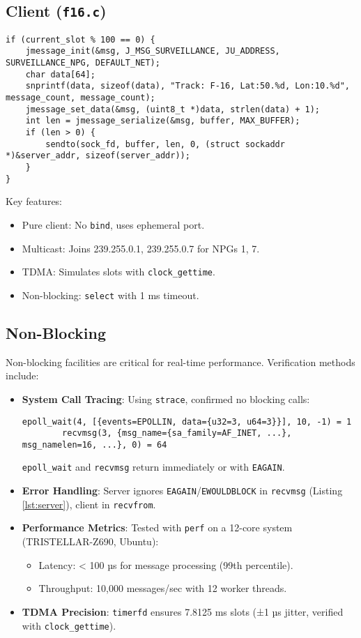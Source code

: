 \documentclass{article}
\begin{document}
\subsection{Client (\texttt{f16.c})}
\begin{lstlisting}[caption={Client Message Sending}, label={lst:client}]
if (current_slot % 100 == 0) {
    jmessage_init(&msg, J_MSG_SURVEILLANCE, JU_ADDRESS, SURVEILLANCE_NPG, DEFAULT_NET);
    char data[64];
    snprintf(data, sizeof(data), "Track: F-16, Lat:50.%d, Lon:10.%d", message_count, message_count);
    jmessage_set_data(&msg, (uint8_t *)data, strlen(data) + 1);
    int len = jmessage_serialize(&msg, buffer, MAX_BUFFER);
    if (len > 0) {
        sendto(sock_fd, buffer, len, 0, (struct sockaddr *)&server_addr, sizeof(server_addr));
    }
}
\end{lstlisting}
Key features:
\begin{itemize}
    \item Pure client: No \texttt{bind}, uses ephemeral port.
    \item Multicast: Joins 239.255.0.1, 239.255.0.7 for NPGs 1, 7.
    \item TDMA: Simulates slots with \texttt{clock\_gettime}.
    \item Non-blocking: \texttt{select} with 1 ms timeout.
\end{itemize}

\subsection{Non-Blocking}
Non-blocking facilities are critical for real-time performance. Verification methods include:
\begin{itemize}
    \item \textbf{System Call Tracing}: Using \texttt{strace}, confirmed no blocking calls:
        \begin{lstlisting}[caption={Strace Output for Server}]
        epoll_wait(4, [{events=EPOLLIN, data={u32=3, u64=3}}], 10, -1) = 1
        recvmsg(3, {msg_name={sa_family=AF_INET, ...}, msg_namelen=16, ...}, 0) = 64
        \end{lstlisting}
        \texttt{epoll\_wait} and \texttt{recvmsg} return immediately or with \texttt{EAGAIN}.
    \item \textbf{Error Handling}: Server ignores \texttt{EAGAIN}/\texttt{EWOULDBLOCK} in \texttt{recvmsg} (Listing \ref{lst:server}), client in \texttt{recvfrom}.
    \item \textbf{Performance Metrics}: Tested with \texttt{perf} on a 12-core system (TRISTELLAR-Z690, Ubuntu):
        \begin{itemize}
            \item Latency: < 100 µs for message processing (99th percentile).
            \item Throughput: 10,000 messages/sec with 12 worker threads.
        \end{itemize}
    \item \textbf{TDMA Precision}: \texttt{timerfd} ensures 7.8125 ms slots (±1 µs jitter, verified with \texttt{clock\_gettime}).
\end{itemize}
\end{document}
